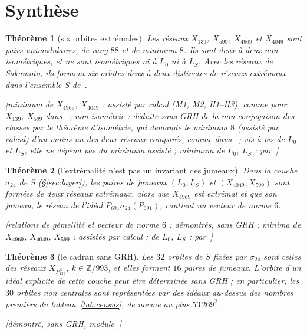\documentclass[11pt,a4paper]{amsart}
\theoremstyle{plain}
\newtheorem{theorem}{Théorème}
\theoremstyle{definition}
\newcommand{\Z}{\mathbb{Z}}
\newcommand{\Lz}{L_{0}}
\newcommand{\LS}{L_{S}}
\newcommand{\st}[1]{\textup{\textsf{\small[#1]}}}
\begin{document}
\section{Synthèse}\label{sec:summary}

\begin{theorem}[six orbites extrémales]\label{thm:six}
Les réseaux $X_{139}$, $X_{599}$, $X_{4969}$ et $X_{4049}$ sont pairs unimodulaires, de rang $88$ et de minimum $8$. Ils sont deux à deux non isométriques, et ne sont isométriques ni à $\Lz$ ni à $\LS$. Avec les réseaux de Sakamoto, ils forment six orbites deux à deux distinctes de réseaux extrémaux dans l'ensemble $S$ de~\cite{Gau26}.

\st{minimum de $X_{4969}$, $X_{4049}$ : assisté par calcul (M1, M2, H1--H3), comme pour $X_{139}$, $X_{599}$ dans~\cite[th.~6.11]{Gau26} ; non-isométrie : déduite sans GRH de la non-conjugaison des classes par le théorème d'isométrie, qui demande le minimum $8$ (assisté par calcul) d'au moins un des deux réseaux comparés, comme dans~\cite[th.~6.11]{Gau26} ; vis-à-vis de $\Lz$ et $\LS$, elle ne dépend pas du minimum assisté ; minimum de $\Lz$, $\LS$ : par~\cite{Sak26}}
\end{theorem}

\begin{theorem}[l'extrémalité n'est pas un invariant des jumeaux]\label{thm:twins}
Dans la couche $\sigma_{24}$ de $S$ (\S\ref{sec:layer}), les paires de jumeaux $(\Lz,\LS)$ et $(X_{4049},X_{599})$ sont formées de deux réseaux extrémaux, alors que $X_{4969}$ est extrémal et que son jumeau, le réseau de l'idéal $P_{691}\sigma_{24}(P_{691})$, contient un vecteur de norme $6$.

\st{relations de gémellité et vecteur de norme $6$ : démontrés, sans GRH ; minima de $X_{4969}$, $X_{4049}$, $X_{599}$ : assistés par calcul ; de $\Lz$, $\LS$ : par~\cite{Sak26}}
\end{theorem}

\begin{theorem}[le cadran sans GRH]\label{thm:dial}
Les $32$ orbites de $S$ fixées par $\sigma_{24}$ sont celles des réseaux $X_{P_{139}^{\,k}}$, $k\in\Z/993$, et elles forment $16$ paires de jumeaux. L'orbite d'un idéal explicite de cette couche peut être déterminée sans GRH ; en particulier, les $30$ orbites non centrales sont représentées par des idéaux au-dessus des nombres premiers du tableau~\ref{tab:census}, de norme au plus $53\,269^2$.

\st{démontré, sans GRH, modulo~\cite[prop.~2.2, 2.5]{Gau26}}
\end{theorem}
\end{document}

